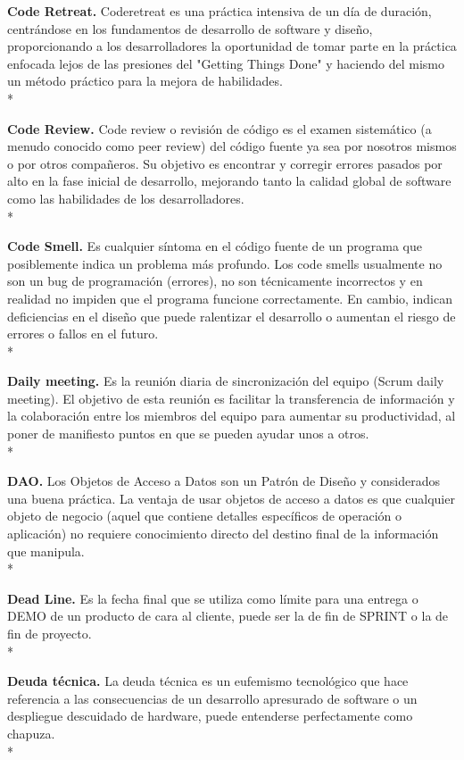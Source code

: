 \documentclass[../pfc.tex]{subfiles}
\begin{document}
	\textbf{Code Retreat.}
	Coderetreat es una práctica intensiva de un día de duración, centrándose en los fundamentos de desarrollo de software y diseño, proporcionando a los desarrolladores la oportunidad de tomar parte en la práctica enfocada lejos de las presiones del "Getting Things Done" y haciendo del mismo un método práctico para la mejora de habilidades.\\*
	
	\textbf{Code Review.}
	Code review o revisión de código es el examen sistemático (a menudo conocido como peer review) del código fuente ya sea por nosotros mismos o por otros compañeros.
	Su objetivo es encontrar y corregir errores pasados por alto en la fase inicial de desarrollo, mejorando tanto la calidad global de software como las habilidades de los desarrolladores.\\*
	
	\textbf{Code Smell.}
	Es cualquier síntoma en el código fuente de un programa que posiblemente indica un problema más profundo. Los code smells usualmente no son un bug de programación (errores), no son técnicamente incorrectos y en realidad no impiden que el programa funcione correctamente. En cambio, indican deficiencias en el diseño que puede ralentizar el desarrollo o aumentan el riesgo de errores o fallos en el futuro.\\*
	
	\textbf{Daily meeting.}
	Es la reunión diaria de sincronización del equipo (Scrum daily meeting).
	El objetivo de esta reunión es facilitar la transferencia de información y la colaboración entre los miembros del equipo para aumentar su productividad, al poner de manifiesto puntos en que se pueden ayudar unos a otros.\\*
	
	\textbf{DAO.}
	Los Objetos de Acceso a Datos son un Patrón de Diseño y considerados una buena práctica.
	La ventaja de usar objetos de acceso a datos es que cualquier objeto de negocio (aquel que contiene detalles específicos de operación o aplicación) no requiere conocimiento directo del destino final de la información que manipula.\\*

	\textbf{Dead Line.}
	Es la fecha final que se utiliza como límite para una entrega o DEMO de un producto de cara al cliente, puede ser la de fin de SPRINT o la de fin de proyecto.\\*
	
	\textbf{Deuda técnica.}
	La deuda técnica es un eufemismo tecnológico que hace referencia a las consecuencias de un desarrollo apresurado de software o un despliegue descuidado de hardware, puede entenderse perfectamente como chapuza.\\* 
	
\end{document}

